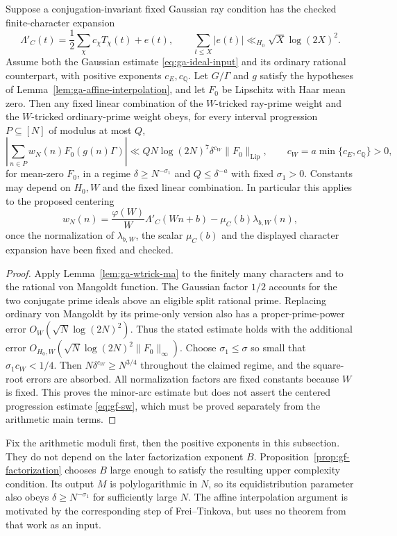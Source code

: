 \begin{corollary}\label{cor:ga-centered-primes}
Suppose a conjugation-invariant fixed Gaussian ray condition has the
checked finite-character expansion
\[
 \Lambda'_C(t)=\frac12\sum_\chi c_\chi T_\chi(t)+e(t),
 \qquad \sum_{t\leq X}|e(t)|\ll_{H_0}\sqrt X\log(2X)^2.
\]
Assume both the Gaussian estimate \eqref{eq:ga-ideal-input} and its
ordinary rational counterpart, with positive exponents $c_E,c_{\mathbb Q}$.
Let $G/\Gamma$ and $g$ satisfy the hypotheses of
Lemma~\ref{lem:ga-affine-interpolation}, and let $F_0$ be Lipschitz with
Haar mean zero.
Then any fixed linear combination of the $W$-tricked ray-prime weight
and the $W$-tricked ordinary-prime weight obeys, for every interval
progression $P\subseteq[N]$ of modulus at most $Q$,
\[
 \left|\sum_{n\in P}w_N(n)F_0(g(n)\Gamma)\right|
 \ll QN\log(2N)^7\delta^{c_W}\|F_0\|_{\mathrm{Lip}},
 \qquad c_W=a\min\{c_E,c_{\mathbb Q}\}>0,
\]
for mean-zero $F_0$, in a regime
$\delta\geq N^{-\sigma_1}$ and $Q\leq\delta^{-a}$ with fixed
$\sigma_1>0$. Constants may depend on $H_0,W$ and the fixed linear
combination. In particular this applies to the proposed centering
\[
 w_N(n)=\frac{\varphi(W)}W\Lambda'_C(Wn+b)
             -\mu_C(b)\lambda_{b,W}(n),
\]
once the normalization of $\lambda_{b,W}$, the scalar $\mu_C(b)$ and
the displayed character expansion have been fixed and checked.
\end{corollary}
\begin{proof}
Apply Lemma~\ref{lem:ga-wtrick-ma} to the finitely many characters and
to the rational von Mangoldt function. The Gaussian factor $1/2$
accounts for the two conjugate prime ideals above an eligible split
rational prime. Replacing ordinary von Mangoldt by its prime-only
version also has a proper-prime-power error
$O_W(\sqrt N\log(2N)^2)$. Thus the stated estimate holds with the
additional error
$O_{H_0,W}(\sqrt N\log(2N)^2\|F_0\|_\infty)$.
Choose $\sigma_1\leq\sigma$ so small that $\sigma_1c_W<1/4$.
Then $N\delta^{c_W}\geq N^{3/4}$ throughout the claimed regime, and
the square-root errors are absorbed. All normalization factors are
fixed constants because $W$ is fixed. This proves the minor-arc
estimate but does not assert the centered progression estimate
\eqref{eq:gf-sw}, which must be proved separately from the arithmetic
main terms.
\end{proof}

\begin{remark}\label{rem:ga-choice-order}
Fix the arithmetic moduli first, then the positive exponents in this
subsection. They do not depend on the later factorization exponent
$B$. Proposition~\ref{prop:gf-factorization} chooses $B$ large enough
to satisfy the resulting upper complexity condition. Its output
$M$ is polylogarithmic in $N$, so its equidistribution parameter also
obeys $\delta\geq N^{-\sigma_1}$ for sufficiently large $N$.
The affine interpolation argument is motivated by the corresponding
step of Frei--Tinkova, but uses no theorem from that work as an input.
\end{remark}


